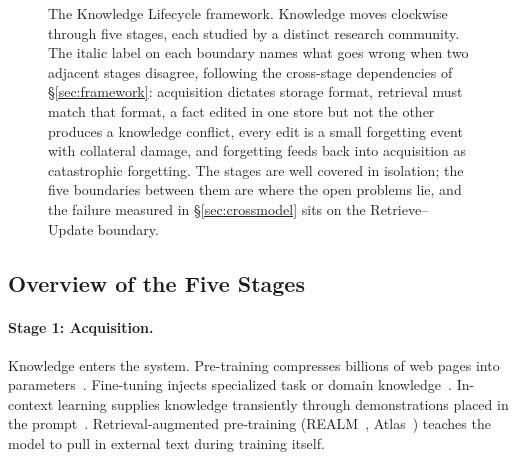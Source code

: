 \documentclass[10pt]{article}
\begin{document}
\begin{figure}[t]
\caption{The Knowledge Lifecycle framework. Knowledge moves clockwise through five stages, each studied by a distinct research community. The italic label on each boundary names what goes wrong when two adjacent stages disagree, following the cross-stage dependencies of \S\ref{sec:framework}: acquisition dictates storage format, retrieval must match that format, a fact edited in one store but not the other produces a knowledge conflict, every edit is a small forgetting event with collateral damage, and forgetting feeds back into acquisition as catastrophic forgetting. The stages are well covered in isolation; the five boundaries between them are where the open problems lie, and the failure measured in \S\ref{sec:crossmodel} sits on the Retrieve--Update boundary.}
\label{fig:lifecycle}
\end{figure}

\subsection{Overview of the Five Stages}

\paragraph{Stage 1: Acquisition.} Knowledge enters the system. Pre-training compresses billions of web pages into parameters~\citep{kaplan2020scaling, hoffmann2022chinchilla}. Fine-tuning injects specialized task or domain knowledge~\citep{hu2022lora}. In-context learning supplies knowledge transiently through demonstrations placed in the prompt~\citep{min2022rethinking}. Retrieval-augmented pre-training (REALM~\citep{guu2020realm}, Atlas~\citep{izacard2023atlas}) teaches the model to pull in external text during training itself.
\end{document}
